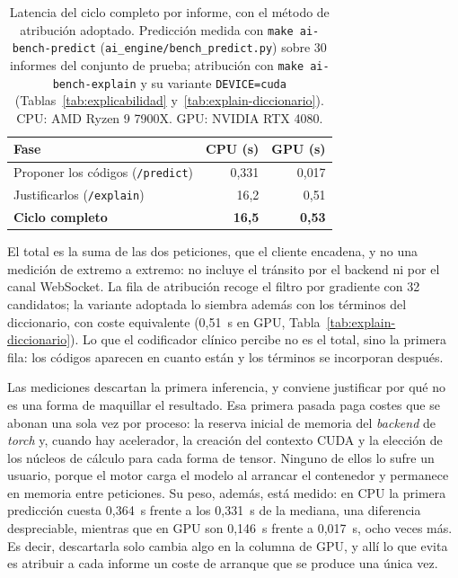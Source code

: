 \begin{table}[h]
\centering
\small
\caption{Latencia del ciclo completo por informe, con el método de atribución adoptado. Predicción medida con \texttt{make ai-bench-predict} (\texttt{ai\_engine/bench\_predict.py}) sobre 30 informes del conjunto de prueba; atribución con \texttt{make ai-bench-explain} y su variante \texttt{DEVICE=cuda} (Tablas~\ref{tab:explicabilidad} y~\ref{tab:explain-diccionario}). CPU: AMD Ryzen 9 7900X. GPU: NVIDIA RTX 4080.}
\label{tab:latencia}
\begin{tabular}{lrr}
\hline
\textbf{Fase} & \textbf{CPU (s)} & \textbf{GPU (s)} \\
\hline
Proponer los códigos (\texttt{/predict})   & 0{,}331 & 0{,}017 \\
Justificarlos (\texttt{/explain})          & 16{,}2  & 0{,}51  \\
\hline
\textbf{Ciclo completo}                    & \textbf{16{,}5} & \textbf{0{,}53} \\
\hline
\end{tabular}

\vspace{2mm}
{\footnotesize El total es la suma de las dos peticiones, que el cliente encadena, y no una medición de extremo a extremo: no incluye el tránsito por el backend ni por el canal WebSocket. La fila de atribución recoge el filtro por gradiente con 32 candidatos; la variante adoptada lo siembra además con los términos del diccionario, con coste equivalente (0{,}51~s en GPU, Tabla~\ref{tab:explain-diccionario}). Lo que el codificador clínico percibe no es el total, sino la primera fila: los códigos aparecen en cuanto están y los términos se incorporan después.}
\end{table}

Las mediciones descartan la primera inferencia, y conviene justificar por qué no es una forma de maquillar el resultado. Esa primera pasada paga costes que se abonan una sola vez por proceso: la reserva inicial de memoria del \emph{backend} de \emph{torch} y, cuando hay acelerador, la creación del contexto CUDA y la elección de los núcleos de cálculo para cada forma de tensor. Ninguno de ellos lo sufre un usuario, porque el motor carga el modelo al arrancar el contenedor y permanece en memoria entre peticiones. Su peso, además, está medido: en CPU la primera predicción cuesta 0{,}364~s frente a los 0{,}331~s de la mediana, una diferencia despreciable, mientras que en GPU son 0{,}146~s frente a 0{,}017~s, ocho veces más. Es decir, descartarla solo cambia algo en la columna de GPU, y allí lo que evita es atribuir a cada informe un coste de arranque que se produce una única vez.

